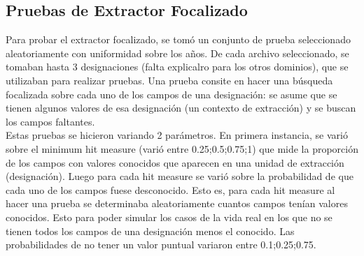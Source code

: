 \subsection{Pruebas de Extractor Focalizado}

Para probar el extractor focalizado, se tomó un conjunto de prueba seleccionado aleatoriamente con uniformidad sobre los años. De cada archivo seleccionado, se tomaban hasta 3 designaciones (falta explicalro para los otros dominios), que se utilizaban para realizar pruebas. Una prueba consite en hacer una búsqueda focalizada sobre cada uno de los campos de una designación: se asume que se tienen algunos valores de esa designación (un contexto de extracción) y se buscan los campos faltantes. \\

Estas pruebas se hicieron variando 2 parámetros. En primera instancia, se varió sobre el minimum hit measure (varió entre 0.25;0.5;0.75;1) que mide la proporción de los campos con valores conocidos que aparecen en una unidad de extracción (designación). Luego para cada hit measure se varió sobre la probabilidad de que cada uno de los campos fuese desconocido. Esto es, para cada hit measure al hacer una prueba se determinaba aleatoriamente cuantos campos tenían valores conocidos. Esto para poder simular los casos de la vida real en los que no se tienen todos los campos de una designación menos el conocido. Las probabilidades de no tener un valor puntual variaron entre 0.1;0.25;0.75. \\


